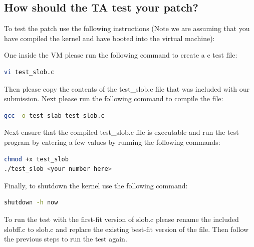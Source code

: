 \documentclass[letterpaper, onecolumn, draftclsnofoot, 10pt, compsoc]{IEEEtran}
\begin{document}
    \subsection{How should the TA test your patch?}
        \begin{singlespace}
        To test the patch use the following instructions (Note we are assuming that you have compiled the kernel and have booted into the virtual machine):
        
        One inside the VM please run the following command to create a c test file:
        \begin{lstlisting}[language=bash]
vi test_slob.c
        \end{lstlisting}
        
        Then please copy the contents of the test\_slob.c file that was included with our submission. Next please run the following command to compile the file:
        \begin{lstlisting}[language=bash]
        gcc -o test_slab test_slob.c
        \end{lstlisting}
        
        Next ensure that the compiled test\_slob.c file is executable and run the test program by entering a few values by running the following commands:
        \begin{lstlisting}[language=bash]
chmod +x test_slob
./test_slob <your number here>
        \end{lstlisting}
        
        Finally, to shutdown the kernel use the following command:
        \begin{lstlisting}[language=bash]
shutdown -h now
        \end{lstlisting}
        
        To run the test with the first-fit version of slob.c please rename the included slobff.c to slob.c and replace the existing best-fit version of the file. Then follow the previous steps to run the test again.

        \end{singlespace}
\end{document}
